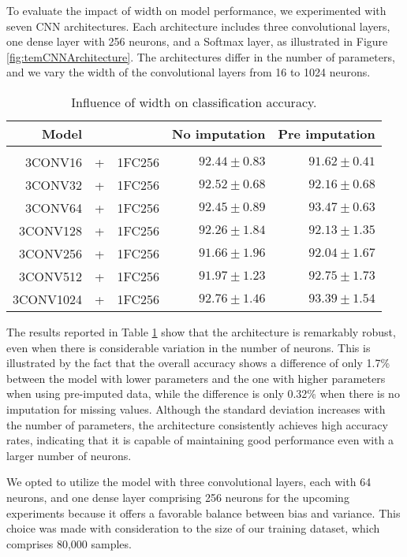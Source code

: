 To evaluate the impact of width on model performance, we experimented with seven CNN architectures.
Each architecture includes three convolutional layers, one dense layer with 256 neurons, and a Softmax layer, as illustrated in Figure \ref{fig:temCNNArchitecture}.
The architectures differ in the number of parameters, and we vary the width of the convolutional layers from 16 to 1024 neurons.

 \begin{table}[H]
  \centering
   \begin{tabular}{rclrr}
   Model&&                  & No imputation         & Pre imputation             \\[0.2cm]
   \hline \\[-0.2cm]
   3CONV16 &+& 1FC256    	 & $92.44 \pm 0.83$ 	 & $91.62 \pm 0.41$\\
   3CONV32 &+& 1FC256    	 & $92.52 \pm 0.68$ 	 & $92.16 \pm 0.68$\\
   3CONV64 &+& 1FC256    	 & $92.45 \pm 0.89$ 	 & $\mathbf{93.47 \pm 0.63}$\\
   3CONV128 &+& 1FC256   	 & $92.26 \pm 1.84$ 	 & $92.13 \pm 1.35$\\
   3CONV256 &+& 1FC256   	 & $91.66 \pm 1.96$ 	 & $92.04 \pm 1.67$\\
   3CONV512 &+& 1FC256   	 & $91.97 \pm 1.23$ 	 & $92.75 \pm 1.73$\\
   3CONV1024 &+& 1FC256  	 & $\mathbf{92.76 \pm 1.46}$ 	 & $93.39 \pm 1.54$\\
   \end{tabular}
   \caption{Influence of width on classification accuracy.}
   \label{tab:temCNNwidth}
 \end{table}

The results reported in Table \ref{tab:temCNNwidth} show that the architecture is remarkably robust, even when there is considerable variation in the number of neurons.
This is illustrated by the fact that the overall accuracy shows a difference of only 1.7\% between the model with lower parameters and the one with higher parameters when using pre-imputed data, while the difference is only 0.32\% when there is no imputation for missing values.
Although the standard deviation increases with the number of parameters, the architecture consistently achieves high accuracy rates, indicating that it is capable of maintaining good performance even with a larger number of neurons.

We opted to utilize the model with three convolutional layers, each with 64 neurons, and one dense layer comprising 256 neurons for the upcoming experiments because it offers a favorable balance between bias and variance.
This choice was made with consideration to the size of our training dataset, which comprises 80,000 samples.

